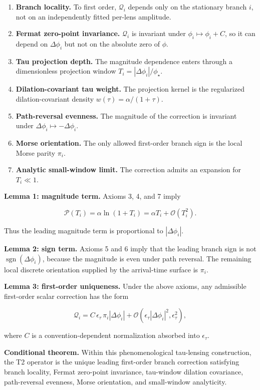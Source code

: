 \documentclass[11pt]{article}
\providecommand{\tightlist}{%
  \setlength{\itemsep}{0pt}\setlength{\parskip}{0pt}}
\begin{document}
\begin{enumerate}
\def\labelenumi{\arabic{enumi}.}
\tightlist
\item
  \textbf{Branch locality.} To first order, \(\mathcal{Q}_i\) depends
  only on the stationary branch \(i\), not on an independently fitted
  per-lens amplitude.
\item
  \textbf{Fermat zero-point invariance.} \(\mathcal{Q}_i\) is invariant
  under \(\phi_i\mapsto \phi_i+C\), so it can depend on \(\Delta\phi_i\)
  but not on the absolute zero of \(\phi\).
\item
  \textbf{Tau projection depth.} The magnitude dependence enters through
  a dimensionless projection window \(T_i=|\Delta\phi_i|/\phi_\star\).
\item
  \textbf{Dilation-covariant tau weight.} The projection kernel is the
  regularized dilation-covariant density \(w(\tau)=\alpha/(1+\tau)\).
\item
  \textbf{Path-reversal evenness.} The magnitude of the correction is
  invariant under \(\Delta\phi_i\mapsto-\Delta\phi_i\).
\item
  \textbf{Morse orientation.} The only allowed first-order branch sign
  is the local Morse parity \(\pi_i\).
\item
  \textbf{Analytic small-window limit.} The correction admits an
  expansion for \(T_i\ll1\).
\end{enumerate}

\textbf{Lemma 1: magnitude term.} Axioms 3, 4, and 7 imply

\[
\mathcal{P}(T_i)
=
\alpha\ln(1+T_i)
=
\alpha T_i+\mathcal{O}(T_i^2).
\]

Thus the leading magnitude term is proportional to \(|\Delta\phi_i|\).

\textbf{Lemma 2: sign term.} Axioms 5 and 6 imply that the leading
branch sign is not \(\operatorname{sgn}(\Delta\phi_i)\), because the
magnitude is even under path reversal. The remaining local discrete
orientation supplied by the arrival-time surface is \(\pi_i\).

\textbf{Lemma 3: first-order uniqueness.} Under the above axioms, any
admissible first-order scalar correction has the form

\[
\mathcal{Q}_i
=
C\,\epsilon_\tau\,\pi_i|\Delta\phi_i|
+\mathcal{O}(\epsilon_\tau|\Delta\phi_i|^2,\epsilon_\tau^2),
\]

where \(C\) is a convention-dependent normalization absorbed into
\(\epsilon_\tau\).

\textbf{Conditional theorem.} Within this phenomenological tau-lensing
construction, the T2 operator is the unique leading first-order branch
correction satisfying branch locality, Fermat zero-point invariance,
tau-window dilation covariance, path-reversal evenness, Morse
orientation, and small-window analyticity.
\end{document}
